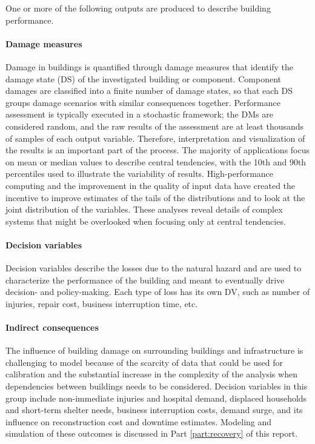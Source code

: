 \noindent One or more of the following outputs are produced to describe building performance.

\paragraph{Damage measures} Damage in buildings is quantified through damage measures that identify the damage state (DS) of the investigated building or component. Component damages are classified into a finite number of damage states, so that each DS groups damage scenarios with similar consequences together. Performance assessment is typically executed in a stochastic framework; the DMs are considered random, and the raw results of the assessment are at least thousands of samples of each output variable. Therefore, interpretation and visualization of the results is an important part of the process. The majority of applications focus on mean or median values to describe central tendencies, with the 10th and 90th percentiles used to illustrate the variability of results. High-performance computing and the improvement in the quality of input data have created the incentive to improve estimates of the tails of the distributions and to look at the joint distribution of the variables. These analyses reveal details of complex systems that might be overlooked when focusing only at central tendencies.

\paragraph{Decision variables} Decision variables describe the losses due to the natural hazard and are used to characterize the performance of the building and meant to eventually drive decision- and policy-making. Each type of loss has its own DV, such as number of injuries, repair cost, business interruption time, etc.

\paragraph{Indirect consequences} The influence of building damage on surrounding buildings and infrastructure is challenging to model because of the scarcity of data that could be used for calibration and the substantial increase in the complexity of the analysis when dependencies between buildings needs to be considered. Decision variables in this group include non-immediate injuries and hospital demand, displaced households and short-term shelter needs, business interruption costs, demand surge, and its influence on reconstruction cost and downtime estimates. Modeling and simulation of these  outcomes is discussed in Part \ref{part:recovery} of this report.

